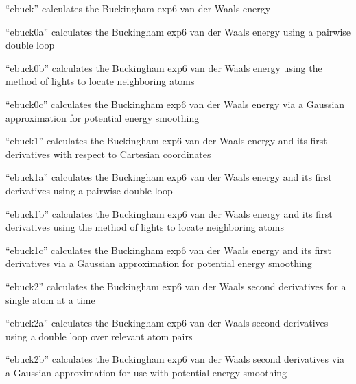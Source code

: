 \documentclass[letterpaper,11pt,english]{sphinxmanual}
\begin{document}

“ebuck” calculates the Buckingham exp\sphinxhyphen{}6 van der Waals energy


“ebuck0a” calculates the Buckingham exp\sphinxhyphen{}6 van der Waals energy using a pairwise double loop


“ebuck0b” calculates the Buckingham exp\sphinxhyphen{}6 van der Waals energy using the method of lights to locate neighboring atoms


“ebuck0c” calculates the Buckingham exp\sphinxhyphen{}6 van der Waals energy via a Gaussian approximation for potential energy smoothing


“ebuck1” calculates the Buckingham exp\sphinxhyphen{}6 van der Waals energy and its first derivatives with respect to Cartesian coordinates


“ebuck1a” calculates the Buckingham exp\sphinxhyphen{}6 van der Waals energy and its first derivatives using a pairwise double loop


“ebuck1b” calculates the Buckingham exp\sphinxhyphen{}6 van der Waals energy and its first derivatives using the method of lights to locate neighboring atoms


“ebuck1c” calculates the Buckingham exp\sphinxhyphen{}6 van der Waals energy and its first derivatives via a Gaussian approximation for potential energy smoothing


“ebuck2” calculates the Buckingham exp\sphinxhyphen{}6 van der Waals second derivatives for a single atom at a time


“ebuck2a” calculates the Buckingham exp\sphinxhyphen{}6 van der Waals second derivatives using a double loop over relevant atom pairs


“ebuck2b” calculates the Buckingham exp\sphinxhyphen{}6 van der Waals second derivatives via a Gaussian approximation for use with potential energy smoothing
\end{document}
